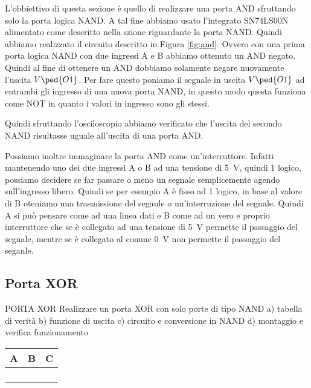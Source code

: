 L'obbiettivo di questa sezione è quello di realizzare una porta AND sfruttando solo la porta logica NAND. A tal fine abbiamo usato l'integrato SN74LS00N alimentato come descritto nella szione riguardante la porta NAND.
Quindi abbiamo realizzato il circuito descritto in Figura \ref{fig:and}. Ovvero con una prima porta logica NAND con due ingressi A e B abbiamo ottenuto un AND negato. Quindi al fine di ottenere un AND dobbiamo solamente negare nuovamente l'uscita $V\ped{O1}$. Per fare questo poniamo il segnale in uscita $V\ped{O1}$ ad entrambi gli ingresso di una nuova porta NAND, in questo modo questa funziona come NOT in quanto i valori in ingresso sono gli stessi.

Quindi sfruttando l'osciloscopio abbiamo verificato che l'uscita del secondo NAND risultasse uguale all'uscita di una porta AND.

Possiamo inoltre immaginare la porta AND come un'interruttore. Infatti mantenendo uno dei due ingressi A o B ad una tensione di \SI{+5}{\volt}, quindi 1 logico, possiamo decidere se far passare o meno un segnale semplicemente agendo sull'ingresso libero.
Quindi se per esempio A è fisso ad 1 logico, in base al valore di B oteniamo una trasmissione del seganle o un'interruzione del segnale. Quindi A si può pensare come ad una linea dati e B come ad un vero e proprio interruttore che se è collegato ad una tensione di \SI{+5}{\volt} permette il passaggio del segnale, mentre se è collegato al conune \SI{0}{\volt} non permette il passaggio del seganle.

\subsection*{Porta XOR}



PORTA XOR
Realizzare un porta XOR con solo porte di tipo NAND
a) tabella di verità
b) funzione di uscita
c) circuito e conversione in NAND
d) montaggio e verifica funzionamento







\begin{center}
	\begin{tabular}{lll}
	\toprule
		A & B & C \\
	\midrule
		& & \\
		& & \\
		& & \\
		& & \\
	\bottomrule
	\end{tabular}
\end{center}

